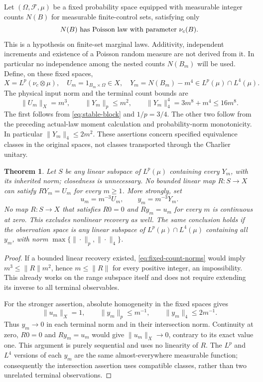 \documentclass[11pt]{article}
\newtheorem{theorem}{Theorem}[section]
\begin{document}
Let $(\Omega,\mathcal F,\mu)$ be a fixed probability space equipped
with measurable integer counts $N(B)$ for measurable finite-control
sets, satisfying only
\[
 N(B)\ \hbox{has Poisson law with parameter }\nu_c(B).
\]
This is a hypothesis on finite-set marginal laws. Additivity,
independent increments and existence of a Poisson random measure are
not derived from it. In particular no independence among the nested
counts $N(B_m)$ will be used. Define, on these fixed spaces,
\[
 X=L^p(\nu_c\otimes\mu),\quad
 U_m=1_{B_m\times\Omega}\in X,\quad
 Y_m=N(B_m)-m^4\in L^p(\mu)\cap L^4(\mu).
\]
The physical input norm and the terminal count bounds are
\begin{equation}\label{eq:fixed-count-norms}
 \|U_m\|_X=m^3,\qquad
 \|Y_m\|_p\leq m^2,\qquad
 \|Y_m\|_4^4=3m^8+m^4\leq16m^8.
\end{equation}
The first follows from \eqref{eq:stable-block} and $1/p=3/4$.
The other two follow from the preceding actual-law moment calculation
and probability-norm monotonicity. In particular $\|Y_m\|_4\leq2m^2$.
These assertions concern specified equivalence classes in the original
spaces, not classes transported through the Charlier unitary.

\begin{theorem}\label{thm:fixed-recovery}
Let $S$ be any linear subspace of $L^p(\mu)$ containing every $Y_m$,
with its inherited norm; closedness is unnecessary. No bounded linear
map $R:S\to X$ can satisfy $RY_m=U_m$ for every $m\geq1$.
More strongly, set
\[
 u_m=m^{-3}U_m,\qquad y_m=m^{-3}Y_m.
\]
No map $R:S\to X$ that satisfies $R0=0$ and $Ry_m=u_m$ for every
$m$ is continuous at zero. This excludes nonlinear recovery as well.
The same conclusion holds if the observation space is any linear
subspace of $L^p(\mu)\cap L^4(\mu)$ containing all $y_m$, with
norm $\max\{\|\cdot\|_p,\|\cdot\|_4\}$.
\end{theorem}
\begin{proof}
If a bounded linear recovery existed, \eqref{eq:fixed-count-norms}
would imply $m^3\leq\|R\|m^2$, hence $m\leq\|R\|$ for every
positive integer, an impossibility. This already works on the range
subspace itself and does not require extending its inverse to all
terminal observables.

For the stronger assertion, absolute homogeneity in the fixed spaces
gives
\[
 \|u_m\|_X=1,\qquad
 \|y_m\|_p\leq m^{-1},\qquad
 \|y_m\|_4\leq2m^{-1}.
\]
Thus $y_m\to0$ in each terminal norm and in their intersection norm.
Continuity at zero, $R0=0$ and $Ry_m=u_m$ would give
$\|u_m\|_X\to0$, contrary to its exact value one. This argument is
purely sequential and uses no linearity of $R$. The $L^p$ and $L^4$
versions of each $y_m$ are the same almost-everywhere measurable
function; consequently the intersection assertion uses compatible
classes, rather than two unrelated terminal observations.
\end{proof}
\end{document}
